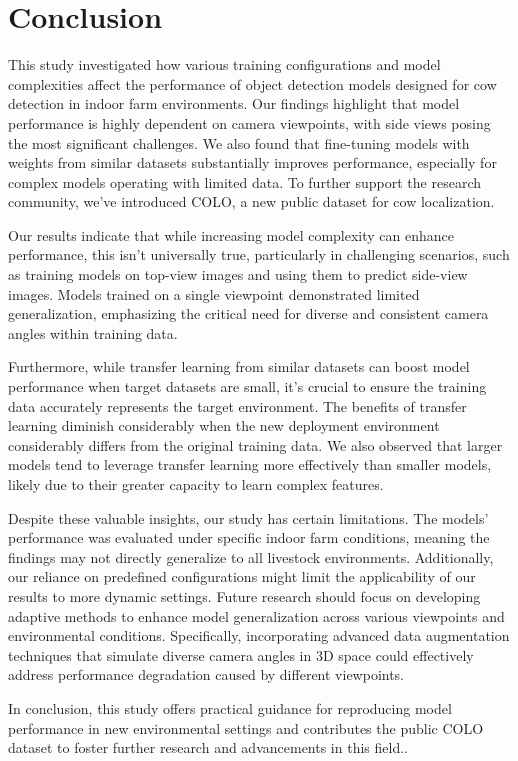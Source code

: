 \section{Conclusion}

This study investigated how various training configurations and model complexities affect the performance of object detection models designed for cow detection in indoor farm environments. Our findings highlight that model performance is highly dependent on camera viewpoints, with side views posing the most significant challenges. We also found that fine-tuning models with weights from similar datasets substantially improves performance, especially for complex models operating with limited data. To further support the research community, we've introduced COLO, a new public dataset for cow localization.

Our results indicate that while increasing model complexity can enhance performance, this isn't universally true, particularly in challenging scenarios, such as training models on top-view images and using them to predict side-view images. Models trained on a single viewpoint demonstrated limited generalization, emphasizing the critical need for diverse and consistent camera angles within training data.

Furthermore, while transfer learning from similar datasets can boost model performance when target datasets are small, it's crucial to ensure the training data accurately represents the target environment. The benefits of transfer learning diminish considerably when the new deployment environment considerably differs from the original training data. We also observed that larger models tend to leverage transfer learning more effectively than smaller models, likely due to their greater capacity to learn complex features.

Despite these valuable insights, our study has certain limitations. The models' performance was evaluated under specific indoor farm conditions, meaning the findings may not directly generalize to all livestock environments. Additionally, our reliance on predefined configurations might limit the applicability of our results to more dynamic settings. Future research should focus on developing adaptive methods to enhance model generalization across various viewpoints and environmental conditions. Specifically, incorporating advanced data augmentation techniques that simulate diverse camera angles in 3D space could effectively address performance degradation caused by different viewpoints.

In conclusion, this study offers practical guidance for reproducing model performance in new environmental settings and contributes the public COLO dataset to foster further research and advancements in this field..
